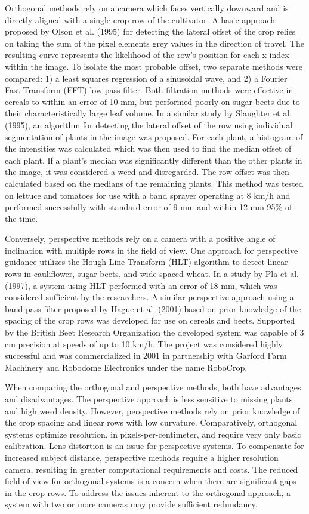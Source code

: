 Orthogonal methods rely on a camera which faces vertically downward
and is directly aligned with a single crop row of the cultivator. A
basic approach proposed by Olson et al. (1995) for detecting the
lateral offset of the crop relies on taking the sum of the pixel
elements grey values in the direction of travel. The resulting curve
represents the likelihood of the row’s position for each x-index
within the image. To isolate the most probable offset, two separate
methods were compared: 1) a least squares regression of a sinusoidal
wave, and 2) a Fourier Fast Transform (FFT) low-pass filter. Both
filtration methods were effective in cereals to within an error of 10
mm, but performed poorly on sugar beets due to their
characteristically large leaf volume. In a similar study by Slaughter
et al. (1995), an algorithm for detecting the lateral offset of the
row using individual segmentation of plants in the image was
proposed. For each plant, a histogram of the intensities was
calculated which was then used to find the median offset of each
plant. If a plant’s median was significantly different than the other
plants in the image, it was considered a weed and disregarded. The row
offset was then calculated based on the medians of the remaining
plants. This method was tested on lettuce and tomatoes for use with a
band sprayer operating at 8 km/h and performed successfully with
standard error of 9 mm and within 12 mm 95\% of the time.

Conversely, perspective methods rely on a camera with a positive angle
of inclination with multiple rows in the field of view. One approach
for perspective guidance utilizes the Hough Line Transform (HLT)
algorithm to detect linear rows in cauliflower, sugar beets, and
wide-spaced wheat. In a study by Pla et al. (1997), a system using HLT
performed with an error of 18 mm, which was considered sufficient by
the researchers. A similar perspective approach using a band-pass
filter proposed by Hague et al. (2001) based on prior knowledge of the
spacing of the crop rows was developed for use on cereals and
beets. Supported by the British Beet Research Organization the
developed system was capable of 3 cm precision at speeds of up to 10
km/h. The project was considered highly successful and was
commercialized in 2001 in partnership with Garford Farm Machinery and
Robodome Electronics under the name RoboCrop.

When comparing the orthogonal and perspective methods, both have
advantages and disadvantages. The perspective approach is less
sensitive to missing plants and high weed density. However,
perspective methods rely on prior knowledge of the crop spacing and
linear rows with low curvature. Comparatively, orthogonal systems
optimize resolution, in pixels-per-centimeter, and require very only
basic calibration. Lens distortion is an issue for perspective
systems. To compensate for increased subject distance, perspective
methods require a higher resolution camera, resulting in greater
computational requirements and costs. The reduced field of view for
orthogonal systems is a concern when there are significant gaps in the
crop rows. To address the issues inherent to the orthogonal approach,
a system with two or more cameras may provide sufficient redundancy.

